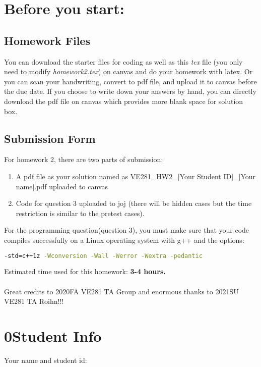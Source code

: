 \documentclass[11pt]{exam}
\begin{document}
\setlength{\parindent}{0pt}
\section*{Before you start:}

\subsection*{Homework Files}
You can download the starter files for coding as well as this \textit{tex} file (you only need to modify \textit{homework2.tex}) on canvas and do your homework with latex. Or you can scan your handwriting, convert to pdf file, and upload it to canvas before the due date. If you choose to write down your answers by hand, you can directly download the pdf file on canvas which provides more blank space for solution box.\\

\subsection*{Submission Form}
For homework 2, there are two parts of submission:
\begin{enumerate}
    \item A pdf file as your solution named as VE281\_HW2\_[Your Student ID]\_[Your name].pdf uploaded to canvas
    \item Code for question 3 uploaded to joj (there will be hidden cases but the time restriction is similar to the pretest cases).
\end{enumerate}
For the programming question(question 3), you must make sure that your code compiles successfully on a Linux operating system with g++ and the options:
\begin{lstlisting}[language=bash]
-std=c++1z -Wconversion -Wall -Werror -Wextra -pedantic
\end{lstlisting}

Estimated time used for this homework: \textbf{3-4 hours.}
\\\\
Great credits to 2020FA VE281 TA Group and enormous thanks to 2021SU VE281 TA Roihn!!!

\newpage
\section*{0\quad Student Info}
Your name and student id:
\begin{solution}
\end{solution}
\end{document}
